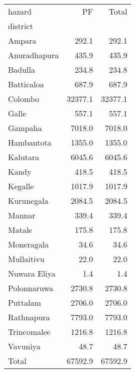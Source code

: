 \begin{tabular}{lrr}
\toprule
hazard &       PF &    Total \\
district     &          &          \\
\midrule
Ampara       &    292.1 &    292.1 \\
Anuradhapura &    435.9 &    435.9 \\
Badulla      &    234.8 &    234.8 \\
Batticaloa   &    687.9 &    687.9 \\
Colombo      &  32377.1 &  32377.1 \\
Galle        &    557.1 &    557.1 \\
Gampaha      &   7018.0 &   7018.0 \\
Hambantota   &   1355.0 &   1355.0 \\
Kalutara     &   6045.6 &   6045.6 \\
Kandy        &    418.5 &    418.5 \\
Kegalle      &   1017.9 &   1017.9 \\
Kurunegala   &   2084.5 &   2084.5 \\
Mannar       &    339.4 &    339.4 \\
Matale       &    175.8 &    175.8 \\
Moneragala   &     34.6 &     34.6 \\
Mullaitivu   &     22.0 &     22.0 \\
Nuwara Eliya &      1.4 &      1.4 \\
Polonnaruwa  &   2730.8 &   2730.8 \\
Puttalam     &   2706.0 &   2706.0 \\
Rathnapura   &   7793.0 &   7793.0 \\
Trincomalee  &   1216.8 &   1216.8 \\
Vavuniya     &     48.7 &     48.7 \\
Total        &  67592.9 &  67592.9 \\
\bottomrule
\end{tabular}
